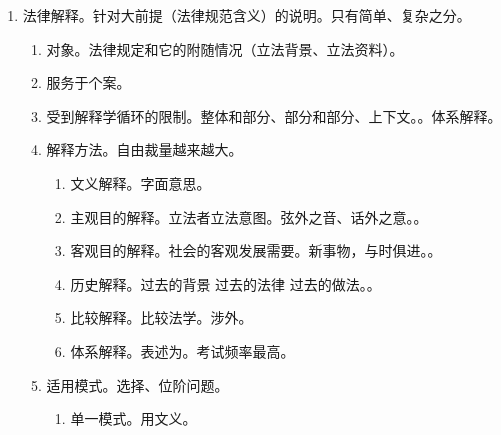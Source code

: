 \begin{enumerate}
\begin{enumerate}
\begin{enumerate}
                  \item 反向推理。满足条件才可以，不满足条件不行。A 情况 \yjt 适用 R，B \bdy A，B \yjt| R。消极推理。
                        \begin{enumerate}
                          \item 可以有效防止某个规则被随意适用。。
                          \item 明示其一，即否定其余。。
                        \end{enumerate}
                  \item 当然推理。理所应当。先定性轻重 \yjt 再对比 \yjt 得出结论。
                \end{enumerate}
          \item 法律解释。针对大前提（法律规范含义）的说明。只有简单、复杂之分。
                \begin{enumerate}
                  \item 对象。法律规定和它的附随情况（立法背景、立法资料）。
                  \item 服务于个案。
                  \item 受到解释学循环的限制。整体和部分、部分和部分、上下文。。体系解释。
                  \item 解释方法。自由裁量越来越大。
                        \begin{enumerate}
                          \item 文义解释。字面意思。
                          \item 主观目的解释。立法者立法意图。弦外之音、话外之意。。
                          \item 客观目的解释。社会的客观发展需要。新事物，与时俱进。。
                          \item 历史解释。过去的背景 \dy 过去的法律 \dy 过去的做法。。
                          \item 比较解释。比较法学。涉外。
                          \item 体系解释。表述为。考试频率最高。
                        \end{enumerate}
                  \item 适用模式。选择、位阶问题。
                        \begin{enumerate}
                          \item 单一模式。用文义。

\end{enumerate}
\end{enumerate}
\end{enumerate}
\end{enumerate}
